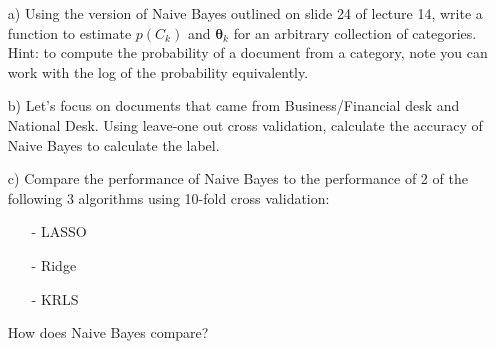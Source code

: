 \documentclass[12pt,letterpaper]{article}
\begin{document}
\begin{itemize}
\item[a)] Using the version of Naive Bayes outlined on slide 24 of lecture 14, write a function to estimate $p(C_{k})$ and $\boldsymbol{\theta}_{k}$ for an arbitrary collection of categories.  Hint: to compute the probability of a document from a category, note you can work with the log of the probability equivalently.  
\item[b)] Let's focus on documents that came from Business/Financial desk and National Desk.  Using leave-one out cross validation, calculate the accuracy of Naive Bayes to calculate the label.
\item[c)] Compare the performance of Naive Bayes to the performance of 2 of the following 3 algorithms using 10-fold cross validation:
\begin{itemize}
\item[-] LASSO 
\item[-] Ridge 
\item[-] KRLS 
\end{itemize}
How does Naive Bayes compare? 
\end{itemize}
\end{document}
